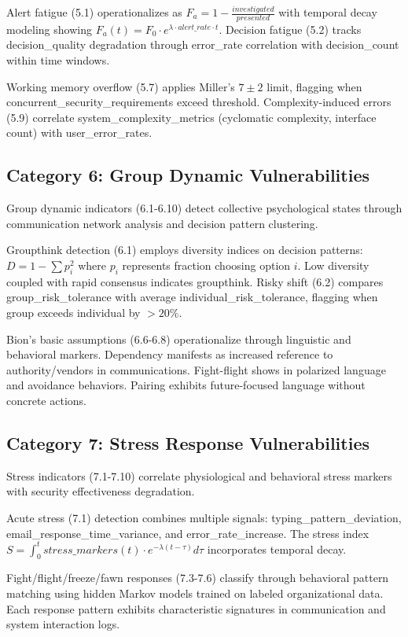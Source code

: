 \documentclass[10pt, twocolumn]{article}
\begin{document}
Alert fatigue (5.1) operationalizes as $F_a = 1 - \frac{investigated}{presented}$ with temporal decay modeling showing $F_a(t) = F_0 \cdot e^{\lambda \cdot alert\_rate \cdot t}$. Decision fatigue (5.2) tracks decision\_quality degradation through error\_rate correlation with decision\_count within time windows.

Working memory overflow (5.7) applies Miller's $7\pm2$ limit, flagging when concurrent\_security\_requirements exceed threshold. Complexity-induced errors (5.9) correlate system\_complexity\_metrics (cyclomatic complexity, interface count) with user\_error\_rates.

\subsection{Category 6: Group Dynamic Vulnerabilities}

Group dynamic indicators (6.1-6.10) detect collective psychological states through communication network analysis and decision pattern clustering.

Groupthink detection (6.1) employs diversity indices on decision patterns: $D = 1 - \sum p_i^2$ where $p_i$ represents fraction choosing option $i$. Low diversity coupled with rapid consensus indicates groupthink. Risky shift (6.2) compares group\_risk\_tolerance with average individual\_risk\_tolerance, flagging when group exceeds individual by $>20\%$.

Bion's basic assumptions (6.6-6.8) operationalize through linguistic and behavioral markers. Dependency manifests as increased reference to authority/vendors in communications. Fight-flight shows in polarized language and avoidance behaviors. Pairing exhibits future-focused language without concrete actions.

\subsection{Category 7: Stress Response Vulnerabilities}

Stress indicators (7.1-7.10) correlate physiological and behavioral stress markers with security effectiveness degradation.

Acute stress (7.1) detection combines multiple signals: typing\_pattern\_deviation, email\_response\_time\_variance, and error\_rate\_increase. The stress index $S = \int_0^t stress\_markers(t) \cdot e^{-\lambda(t-\tau)} d\tau$ incorporates temporal decay.

Fight/flight/freeze/fawn responses (7.3-7.6) classify through behavioral pattern matching using hidden Markov models trained on labeled organizational data. Each response pattern exhibits characteristic signatures in communication and system interaction logs.
\end{document}
